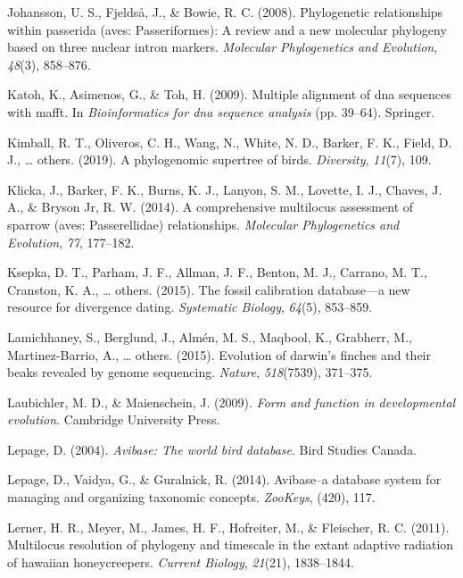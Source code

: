 \documentclass[english,man]{apa6}
\begin{document}
\leavevmode\hypertarget{ref-johansson2008phylogenetic}{}%
Johansson, U. S., Fjeldså, J., \& Bowie, R. C. (2008). Phylogenetic relationships within passerida (aves: Passeriformes): A review and a new molecular phylogeny based on three nuclear intron markers. \emph{Molecular Phylogenetics and Evolution}, \emph{48}(3), 858--876.

\leavevmode\hypertarget{ref-katoh2009multiple}{}%
Katoh, K., Asimenos, G., \& Toh, H. (2009). Multiple alignment of dna sequences with mafft. In \emph{Bioinformatics for dna sequence analysis} (pp. 39--64). Springer.

\leavevmode\hypertarget{ref-kimball2019phylogenomic}{}%
Kimball, R. T., Oliveros, C. H., Wang, N., White, N. D., Barker, F. K., Field, D. J., \ldots{} others. (2019). A phylogenomic supertree of birds. \emph{Diversity}, \emph{11}(7), 109.

\leavevmode\hypertarget{ref-klicka2014comprehensive}{}%
Klicka, J., Barker, F. K., Burns, K. J., Lanyon, S. M., Lovette, I. J., Chaves, J. A., \& Bryson Jr, R. W. (2014). A comprehensive multilocus assessment of sparrow (aves: Passerellidae) relationships. \emph{Molecular Phylogenetics and Evolution}, \emph{77}, 177--182.

\leavevmode\hypertarget{ref-ksepka2015fossil}{}%
Ksepka, D. T., Parham, J. F., Allman, J. F., Benton, M. J., Carrano, M. T., Cranston, K. A., \ldots{} others. (2015). The fossil calibration database---a new resource for divergence dating. \emph{Systematic Biology}, \emph{64}(5), 853--859.

\leavevmode\hypertarget{ref-lamichhaney2015evolution}{}%
Lamichhaney, S., Berglund, J., Almén, M. S., Maqbool, K., Grabherr, M., Martinez-Barrio, A., \ldots{} others. (2015). Evolution of darwin's finches and their beaks revealed by genome sequencing. \emph{Nature}, \emph{518}(7539), 371--375.

\leavevmode\hypertarget{ref-laubichler2009form}{}%
Laubichler, M. D., \& Maienschein, J. (2009). \emph{Form and function in developmental evolution}. Cambridge University Press.

\leavevmode\hypertarget{ref-lepage2004avibase}{}%
Lepage, D. (2004). \emph{Avibase: The world bird database}. Bird Studies Canada.

\leavevmode\hypertarget{ref-lepage2014avibase}{}%
Lepage, D., Vaidya, G., \& Guralnick, R. (2014). Avibase--a database system for managing and organizing taxonomic concepts. \emph{ZooKeys}, (420), 117.

\leavevmode\hypertarget{ref-lerner2011multilocus}{}%
Lerner, H. R., Meyer, M., James, H. F., Hofreiter, M., \& Fleischer, R. C. (2011). Multilocus resolution of phylogeny and timescale in the extant adaptive radiation of hawaiian honeycreepers. \emph{Current Biology}, \emph{21}(21), 1838--1844.
\end{document}
